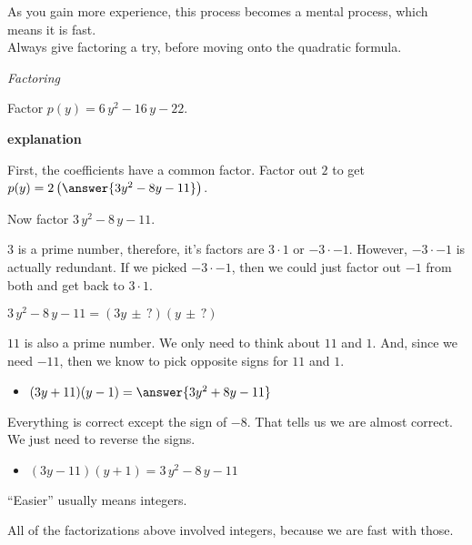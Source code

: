 \documentclass{ximera}
\begin{document}
As you gain more experience, this process becomes a mental process, which means it is fast. \\


Always give factoring a try, before moving onto the quadratic formula. \\






\begin{example} \textit{Factoring}

Factor $p(y) = 6 \, y^2 - 16 \, y - 22$.


\textbf{\textcolor{red!75!green}{explanation}} 


First, the coefficients have a common factor.  Factor out $2$ to get $p(y) = 2 \left( \answer{3 y^2 - 8 y - 11} \right)$.


Now factor $3 \, y^2 - 8 \, y - 11$.



$3$ is a prime number, therefore, it's factors are $3 \cdot 1$ or $-3 \cdot -1$. However, $-3 \cdot -1$ is actually redundant.  If we picked $-3 \cdot -1$, then we could just factor out $-1$ from both and get back to $3 \cdot 1$.


$3 \, y^2 - 8 \, y - 11 = (3y \, \pm \, ?) (y \, \pm \, ?) $


$11$ is also a prime number. We only need to think about $11$ and $1$. And, since we need $-11$, then we know to pick opposite signs for $11$ and $1$.



\begin{itemize}
\item $(3y + 11) (y - 1) = \answer{3 y^2 + 8 y - 11}$
\end{itemize}

Everything is correct except the sign of $-8$. That tells us we are almost correct. We just need to reverse the signs.


\begin{itemize}
\item $(3y - 11) (y + 1) = 3 \, y^2 - 8 \, y - 11$
\end{itemize}





\end{example}


``Easier'' usually means integers.  

All of the factorizations above involved integers, because we are fast with those. \\
\end{document}
